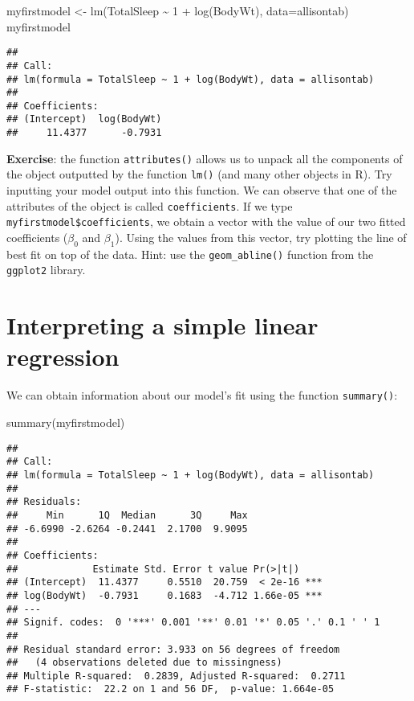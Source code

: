 \documentclass[
]{book}
\newenvironment{Shaded}{\begin{snugshade}}{\end{snugshade}}
\newcommand{\AttributeTok}[1]{\textcolor[rgb]{0.77,0.63,0.00}{#1}}
\newcommand{\DecValTok}[1]{\textcolor[rgb]{0.00,0.00,0.81}{#1}}
\newcommand{\FunctionTok}[1]{\textcolor[rgb]{0.00,0.00,0.00}{#1}}
\newcommand{\NormalTok}[1]{#1}
\newcommand{\OtherTok}[1]{\textcolor[rgb]{0.56,0.35,0.01}{#1}}
\newcommand{\SpecialCharTok}[1]{\textcolor[rgb]{0.00,0.00,0.00}{#1}}
\begin{document}
\begin{Shaded}
\begin{Highlighting}[]
\NormalTok{myfirstmodel }\OtherTok{\textless{}{-}} \FunctionTok{lm}\NormalTok{(TotalSleep }\SpecialCharTok{\textasciitilde{}} \DecValTok{1} \SpecialCharTok{+} \FunctionTok{log}\NormalTok{(BodyWt), }\AttributeTok{data=}\NormalTok{allisontab)  }
\NormalTok{myfirstmodel}
\end{Highlighting}
\end{Shaded}

\begin{verbatim}
## 
## Call:
## lm(formula = TotalSleep ~ 1 + log(BodyWt), data = allisontab)
## 
## Coefficients:
## (Intercept)  log(BodyWt)  
##     11.4377      -0.7931
\end{verbatim}

\textbf{Exercise}: the function \texttt{attributes()} allows us to unpack all the components of the object outputted by the function \texttt{lm()} (and many other objects in R). Try inputting your model output into this function. We can observe that one of the attributes of the object is called \texttt{coefficients}. If we type \texttt{myfirstmodel\$coefficients}, we obtain a vector with the value of our two fitted coefficients (\(\beta_0\) and \(\beta_1\)). Using the values from this vector, try plotting the line of best fit on top of the data. Hint: use the \texttt{geom\_abline()} function from the \texttt{ggplot2} library.

\hypertarget{interpreting-a-simple-linear-regression}{%
\section{Interpreting a simple linear regression}\label{interpreting-a-simple-linear-regression}}

We can obtain information about our model's fit using the function \texttt{summary()}:

\begin{Shaded}
\begin{Highlighting}[]
\FunctionTok{summary}\NormalTok{(myfirstmodel)}
\end{Highlighting}
\end{Shaded}

\begin{verbatim}
## 
## Call:
## lm(formula = TotalSleep ~ 1 + log(BodyWt), data = allisontab)
## 
## Residuals:
##     Min      1Q  Median      3Q     Max 
## -6.6990 -2.6264 -0.2441  2.1700  9.9095 
## 
## Coefficients:
##             Estimate Std. Error t value Pr(>|t|)    
## (Intercept)  11.4377     0.5510  20.759  < 2e-16 ***
## log(BodyWt)  -0.7931     0.1683  -4.712 1.66e-05 ***
## ---
## Signif. codes:  0 '***' 0.001 '**' 0.01 '*' 0.05 '.' 0.1 ' ' 1
## 
## Residual standard error: 3.933 on 56 degrees of freedom
##   (4 observations deleted due to missingness)
## Multiple R-squared:  0.2839, Adjusted R-squared:  0.2711 
## F-statistic:  22.2 on 1 and 56 DF,  p-value: 1.664e-05
\end{verbatim}
\end{document}
